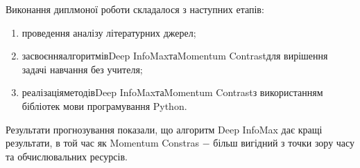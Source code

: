 \label{sec:Summary}

\hspace*{26pt} Виконання диплмоної роботи складалося з наступних етапів:

\begin{enumerate}
	\item проведення аналізу літературних джерел;
	\item засвоєння\hfill алгоритмів\hfill Deep InfoMax\hfill та\hfill Momentum Contrast\hfill для\newline \hspace*{-20mm} вирішення задачі навчання без учителя;
	\item реалізація\hfill методів\hfill Deep InfoMax\hfill та\hfill Momentum Contrast\hfill з\newline \hspace*{-20mm} використанням бібліотек мови програмування Python.
\end{enumerate}

Результати прогнозування показали, що алгоритм Deep InfoMax дає кращі результати, в той час як Momentum Constras $-$ більш вигідний з точки зору часу та обчислювальних ресурсів.
